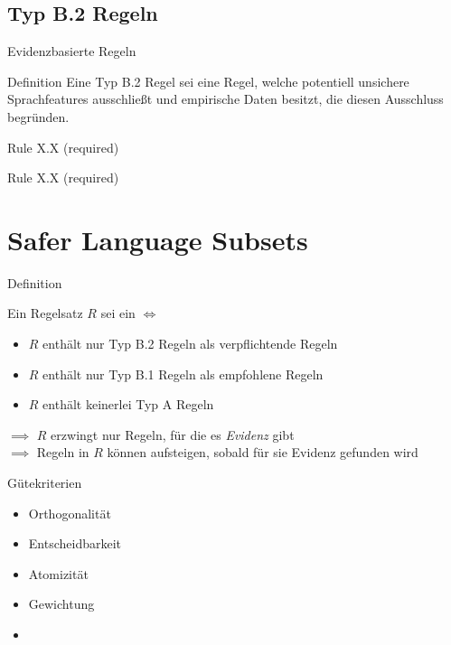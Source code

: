 \documentclass{beamer}
\begin{document}
    \subsection{Typ B.2 Regeln}
    \label{subsec:typ-b-2-regeln}
    \begin{frame}{Evidenzbasierte Regeln}
         {
            \begin{block}{Definition}
                Eine Typ B.2 Regel sei eine Regel, welche potentiell unsichere Sprachfeatures ausschließt und empirische
                Daten besitzt, die diesen Ausschluss begründen.
            \end{block}
            \pause
            \begin{exampleblock}{Rule X.X (required)} %
            \end{exampleblock}
        }
         {
            \begin{exampleblock}{Rule X.X (required)} %
                
            \end{exampleblock}
        }
    \end{frame}

    \section{Safer Language Subsets}
    \label{sec:safer-language-subsets}
    \begin{frame}{Definition}
        \begin{block}{Ein Regelsatz $R$ sei ein \sls $\iff$}
            \begin{itemize}
                \item $R$ enthält nur Typ B.2 Regeln als verpflichtende Regeln
                \item $R$ enthält nur Typ B.1 Regeln als empfohlene Regeln
                \item $R$ enthält keinerlei Typ A Regeln
            \end{itemize}
        \end{block}
        $\implies$ $R$ erzwingt nur Regeln, für die es \textit{Evidenz} gibt\\
        $\implies$ Regeln in $R$ können aufsteigen, sobald für sie Evidenz gefunden wird
    \end{frame}

    \begin{frame}{Gütekriterien}
        \begin{itemize}
            \item Orthogonalität
            \item Entscheidbarkeit
            \item Atomizität
            \item Gewichtung
            \item {}
        \end{itemize}
    \end{frame}
\end{document}

